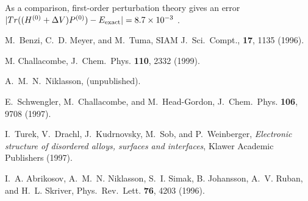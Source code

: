 \documentclass[prl,aps,twocolumn,showpacs,twocolumngrid,superbib]{revtex4}
\begin{document}
\begin{references}
 As a comparison, first-order perturbation theory 
gives an error $|Tr((H^{(0)}+\Delta V)P^{(0)})-E_{\rm exact}| = 8.7 \times 10^{-3}$ .

 M.\ Benzi, C.\ D. Meyer, and M.\ Tuma,
SIAM J.\ Sci.\ Compt., {\bf 17}, 1135 (1996).

 M. Challacombe, 
J.\ Chem.\ Phys. {\bf 110}, 2332 (1999).










 A.\ M.\ N.\ Niklasson, (unpublished).

 E.\ Schwengler, M.\ Challacombe, and M.\ Head-Gordon,
J.\ Chem.\ Phys. {\bf 106}, 9708 (1997).

   I.\ Turek, V.\ Drachl, J.\ Kudrnovsky, M.\ Sob, and
P.\ Weinberger, {\it Electronic structure of disordered alloys, surfaces
and interfaces}, Klawer Academic Publishers (1997). 

 I.\ A. Abrikosov, A.\ M.\ N. Niklasson, S.\ I. Simak,
B. Johansson, A.\ V. Ruban, and H.\ L. Skriver,
Phys.\ Rev.\ Lett. {\bf 76}, 4203 (1996).


\end{references}
\end{document}
